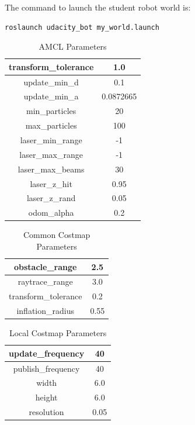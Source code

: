 \documentclass[10pt,journal,compsoc]{IEEEtran}
\begin{document}
The command to launch the student robot world is:
\begin{lstlisting}[language=Bash]
roslaunch udacity_bot my_world.launch
\end{lstlisting}

\begin{table}[h]
\caption{AMCL Parameters}
\label{table_example}
\begin{center}
\begin{tabular}{|c|c|}
\hline
transform\_tolerance & 1.0\\
\hline
update\_min\_d & 0.1\\
\hline
update\_min\_a & 0.0872665\\
\hline
min\_particles & 20\\
\hline
max\_particles & 100\\
\hline
laser\_min\_range & -1\\
\hline
laser\_max\_range & -1\\
\hline
laser\_max\_beams & 30\\
\hline
laser\_z\_hit & 0.95\\
\hline
laser\_z\_rand & 0.05\\
\hline
odom\_alpha & 0.2\\
\hline
\end{tabular}
\end{center}
\end{table}

\begin{table}[h]
\caption{Common Costmap Parameters}
\label{table_example}
\begin{center}
\begin{tabular}{|c|c|}
\hline
obstacle\_range & 2.5\\
\hline
raytrace\_range & 3.0\\
\hline
transform\_tolerance & 0.2\\
\hline
inflation\_radius & 0.55\\
\hline
\hline
\end{tabular}
\end{center}
\end{table}

\begin{table}[h]
\caption{Local Costmap Parameters}
\label{table_example}
\begin{center}
\begin{tabular}{|c|c|}
\hline
update\_frequency & 40\\
\hline
publish\_frequency & 40\\
\hline
width & 6.0\\
\hline
height & 6.0\\
\hline
resolution & 0.05\\
\hline
\hline
\end{tabular}
\end{center}
\end{table}
\end{document}
